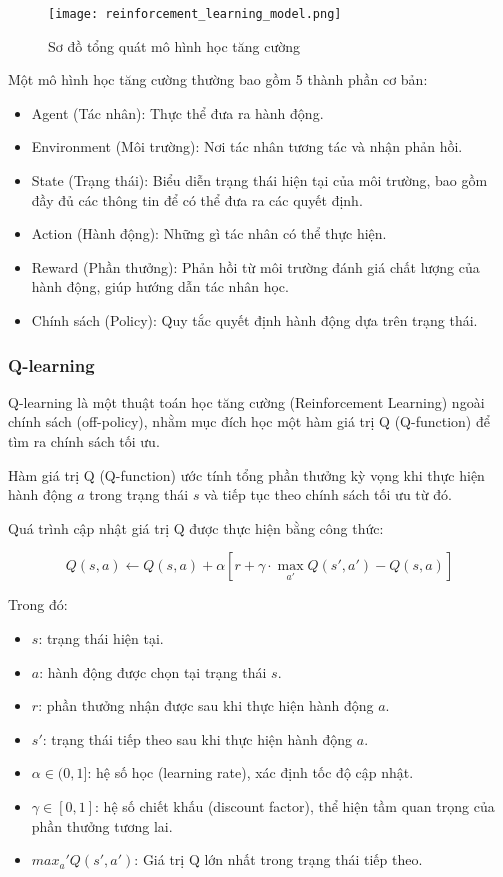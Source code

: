 \begin{figure}
    \texttt{[image: reinforcement\_learning\_model.png]}
    \caption{Sơ đồ tổng quát mô hình học tăng cường}
\end{figure}

Một mô hình học tăng cường thường bao gồm 5 thành phần cơ bản:
\begin{itemize}
    \item Agent (Tác nhân): Thực thể đưa ra hành động.
    \item Environment (Môi trường): Nơi tác nhân tương tác và nhận phản hồi.
    \item State (Trạng thái): Biểu diễn trạng thái hiện tại của môi trường, bao gồm đầy đủ các thông tin để có thể đưa ra các quyết định.
    \item Action (Hành động): Những gì tác nhân có thể thực hiện.
    \item Reward (Phần thưởng): Phản hồi từ môi trường đánh giá chất lượng của hành động, giúp hướng dẫn tác nhân học.
    \item Chính sách (Policy): Quy tắc quyết định hành động dựa trên trạng thái.
\end{itemize}

\subsubsection{Q-learning}

Q-learning là một thuật toán học tăng cường (Reinforcement Learning) ngoài chính sách (off-policy), nhằm mục đích học một hàm giá trị Q (Q-function) để tìm ra chính sách tối ưu.

Hàm giá trị Q (Q-function) ước tính tổng phần thưởng kỳ vọng khi thực hiện hành động $a$ trong trạng thái $s$ và tiếp tục theo chính sách tối ưu từ đó.

Quá trình cập nhật giá trị Q được thực hiện bằng công thức:

\[
    Q(s, a) \leftarrow Q(s, a) + \alpha \left[ r + \gamma \cdot \max_{a'} Q(s', a') - Q(s, a) \right]
\]

Trong đó:
\begin{itemize}
    \item $s$: trạng thái hiện tại.
    \item $a$: hành động được chọn tại trạng thái $s$.
    \item $r$: phần thưởng nhận được sau khi thực hiện hành động $a$.
    \item $s'$: trạng thái tiếp theo sau khi thực hiện hành động $a$.
    \item $\alpha \in (0,1]$: hệ số học (learning rate), xác định tốc độ cập nhật.
    \item $\gamma \in [0,1]$: hệ số chiết khấu (discount factor), thể hiện tầm quan trọng của phần thưởng tương lai.
    \item $max_a' Q(s', a')$: Giá trị Q lớn nhất trong trạng thái tiếp theo.
\end{itemize}


